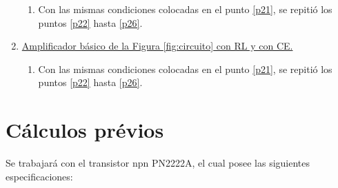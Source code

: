 \documentclass[12pt, a4paper]{article}
\begin{document}
\begin{enumerate}
        \begin{enumerate}
            \item Con las mismas condiciones colocadas en el punto \ref{p21}, se repitió los puntos \ref{p22} hasta \ref{p26}.
        \end{enumerate}
        \item \underline{Amplificador básico de la Figura \ref{fig:circuito} con RL y con CE.} \label{lab4}
        \begin{enumerate}
            \item Con las mismas condiciones colocadas en el punto \ref{p21}, se repitió los puntos \ref{p22} hasta \ref{p26}.
        \end{enumerate}
    \end{enumerate}

    \newpage

    \section{Cálculos prévios}

    Se trabajará con el transistor npn PN2222A, el cual posee las siguientes especificaciones:
\end{document}
